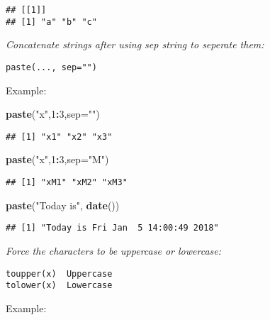 \documentclass[]{book}
\newenvironment{Shaded}{\begin{snugshade}}{\end{snugshade}}
\newcommand{\KeywordTok}[1]{\textcolor[rgb]{0.13,0.29,0.53}{\textbf{#1}}}
\newcommand{\DataTypeTok}[1]{\textcolor[rgb]{0.13,0.29,0.53}{#1}}
\newcommand{\DecValTok}[1]{\textcolor[rgb]{0.00,0.00,0.81}{#1}}
\newcommand{\StringTok}[1]{\textcolor[rgb]{0.31,0.60,0.02}{#1}}
\newcommand{\OperatorTok}[1]{\textcolor[rgb]{0.81,0.36,0.00}{\textbf{#1}}}
\newcommand{\NormalTok}[1]{#1}
\theoremstyle{definition}
\theoremstyle{definition}
\theoremstyle{definition}
\theoremstyle{remark}
\begin{document}
\begin{verbatim}
## [[1]]
## [1] "a" "b" "c"
\end{verbatim}

\emph{Concatenate strings after using sep string to seperate them:}

\begin{verbatim}
paste(..., sep="")  
\end{verbatim}

Example:

\begin{Shaded}
\begin{Highlighting}[]
\KeywordTok{paste}\NormalTok{(}\StringTok{"x"}\NormalTok{,}\DecValTok{1}\OperatorTok{:}\DecValTok{3}\NormalTok{,}\DataTypeTok{sep=}\StringTok{""}\NormalTok{) }
\end{Highlighting}
\end{Shaded}

\begin{verbatim}
## [1] "x1" "x2" "x3"
\end{verbatim}

\begin{Shaded}
\begin{Highlighting}[]
\KeywordTok{paste}\NormalTok{(}\StringTok{"x"}\NormalTok{,}\DecValTok{1}\OperatorTok{:}\DecValTok{3}\NormalTok{,}\DataTypeTok{sep=}\StringTok{"M"}\NormalTok{) }
\end{Highlighting}
\end{Shaded}

\begin{verbatim}
## [1] "xM1" "xM2" "xM3"
\end{verbatim}

\begin{Shaded}
\begin{Highlighting}[]
\KeywordTok{paste}\NormalTok{(}\StringTok{"Today is"}\NormalTok{, }\KeywordTok{date}\NormalTok{())}
\end{Highlighting}
\end{Shaded}

\begin{verbatim}
## [1] "Today is Fri Jan  5 14:00:49 2018"
\end{verbatim}

\emph{Force the characters to be uppercase or lowercase:}

\begin{verbatim}
toupper(x)  Uppercase
tolower(x)  Lowercase
\end{verbatim}

Example:
\end{document}
